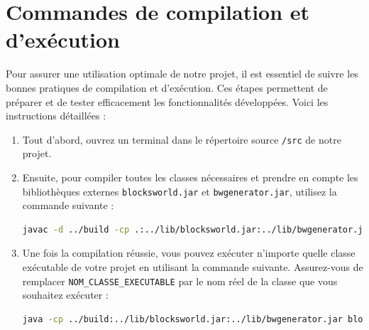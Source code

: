 \documentclass[12pt]{article}
\begin{document}
\section{Commandes de compilation et d'exécution}
Pour assurer une utilisation optimale de notre projet, il est essentiel de suivre les bonnes pratiques de compilation et d'exécution. Ces étapes permettent de préparer et de tester efficacement les fonctionnalités développées. Voici les instructions détaillées :

\begin{enumerate}
    \item Tout d'abord, ouvrez un terminal dans le répertoire source \texttt{/src} de notre projet.
    \item Ensuite, pour compiler toutes les classes nécessaires et prendre en compte les bibliothèques externes \texttt{blocksworld.jar} et \texttt{bwgenerator.jar}, utilisez la commande suivante :
    \begin{lstlisting}[language=Bash, frame=single]
    javac -d ../build -cp .:../lib/blocksworld.jar:../lib/bwgenerator.jar modelling/*.java planning/*.java cp/*.java datamining/*.java blocksworld/*.java
    \end{lstlisting}
    \item Une fois la compilation réussie, vous pouvez exécuter n'importe quelle classe exécutable de votre projet en utilisant la commande suivante. Assurez-vous de remplacer \texttt{NOM\_CLASSE\_EXECUTABLE} par le nom réel de la classe que vous souhaitez exécuter :
    \begin{lstlisting}[language=Bash, frame=single]
    java -cp ../build:../lib/blocksworld.jar:../lib/bwgenerator.jar blocksworld.NOM_CLASSE_EXECUTABLE
    \end{lstlisting}
\end{enumerate}
\end{document}

